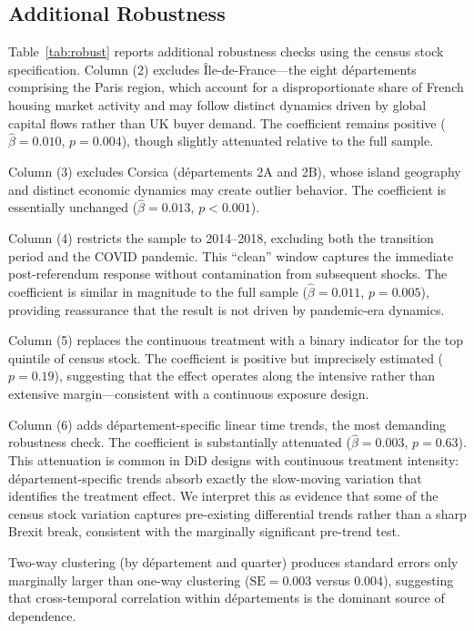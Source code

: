 \documentclass[12pt]{article}
\begin{document}
\subsection{Additional Robustness}

Table~\ref{tab:robust} reports additional robustness checks using the census stock specification. Column (2) excludes \^Ile-de-France---the eight d\'epartements comprising the Paris region, which account for a disproportionate share of French housing market activity and may follow distinct dynamics driven by global capital flows rather than UK buyer demand. The coefficient remains positive ($\hat{\beta} = 0.010$, $p = 0.004$), though slightly attenuated relative to the full sample.

Column (3) excludes Corsica (d\'epartements 2A and 2B), whose island geography and distinct economic dynamics may create outlier behavior. The coefficient is essentially unchanged ($\hat{\beta} = 0.013$, $p < 0.001$).

Column (4) restricts the sample to 2014--2018, excluding both the transition period and the COVID pandemic. This ``clean'' window captures the immediate post-referendum response without contamination from subsequent shocks. The coefficient is similar in magnitude to the full sample ($\hat{\beta} = 0.011$, $p = 0.005$), providing reassurance that the result is not driven by pandemic-era dynamics.

Column (5) replaces the continuous treatment with a binary indicator for the top quintile of census stock. The coefficient is positive but imprecisely estimated ($p = 0.19$), suggesting that the effect operates along the intensive rather than extensive margin---consistent with a continuous exposure design.

Column (6) adds d\'epartement-specific linear time trends, the most demanding robustness check. The coefficient is substantially attenuated ($\hat{\beta} = 0.003$, $p = 0.63$). This attenuation is common in DiD designs with continuous treatment intensity: d\'epartement-specific trends absorb exactly the slow-moving variation that identifies the treatment effect. We interpret this as evidence that some of the census stock variation captures pre-existing differential trends rather than a sharp Brexit break, consistent with the marginally significant pre-trend test.

Two-way clustering (by d\'epartement and quarter) produces standard errors only marginally larger than one-way clustering ($\text{SE} = 0.003$ versus $0.004$), suggesting that cross-temporal correlation within d\'epartements is the dominant source of dependence.
\end{document}
